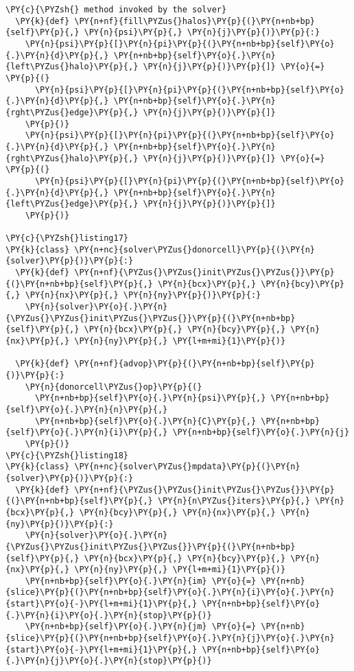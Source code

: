 \begin{Verbatim}[commandchars=\\\{\}]
  \PY{c}{\PYZsh{} method invoked by the solver}
  \PY{k}{def} \PY{n+nf}{fill\PYZus{}halos}\PY{p}{(}\PY{n+nb+bp}{self}\PY{p}{,} \PY{n}{psi}\PY{p}{,} \PY{n}{j}\PY{p}{)}\PY{p}{:}
    \PY{n}{psi}\PY{p}{[}\PY{n}{pi}\PY{p}{(}\PY{n+nb+bp}{self}\PY{o}{.}\PY{n}{d}\PY{p}{,} \PY{n+nb+bp}{self}\PY{o}{.}\PY{n}{left\PYZus{}halo}\PY{p}{,} \PY{n}{j}\PY{p}{)}\PY{p}{]} \PY{o}{=} \PY{p}{(}
      \PY{n}{psi}\PY{p}{[}\PY{n}{pi}\PY{p}{(}\PY{n+nb+bp}{self}\PY{o}{.}\PY{n}{d}\PY{p}{,} \PY{n+nb+bp}{self}\PY{o}{.}\PY{n}{rght\PYZus{}edge}\PY{p}{,} \PY{n}{j}\PY{p}{)}\PY{p}{]}
    \PY{p}{)}
    \PY{n}{psi}\PY{p}{[}\PY{n}{pi}\PY{p}{(}\PY{n+nb+bp}{self}\PY{o}{.}\PY{n}{d}\PY{p}{,} \PY{n+nb+bp}{self}\PY{o}{.}\PY{n}{rght\PYZus{}halo}\PY{p}{,} \PY{n}{j}\PY{p}{)}\PY{p}{]} \PY{o}{=} \PY{p}{(}
      \PY{n}{psi}\PY{p}{[}\PY{n}{pi}\PY{p}{(}\PY{n+nb+bp}{self}\PY{o}{.}\PY{n}{d}\PY{p}{,} \PY{n+nb+bp}{self}\PY{o}{.}\PY{n}{left\PYZus{}edge}\PY{p}{,} \PY{n}{j}\PY{p}{)}\PY{p}{]}
    \PY{p}{)}

\PY{c}{\PYZsh{}listing17}
\PY{k}{class} \PY{n+nc}{solver\PYZus{}donorcell}\PY{p}{(}\PY{n}{solver}\PY{p}{)}\PY{p}{:}
  \PY{k}{def} \PY{n+nf}{\PYZus{}\PYZus{}init\PYZus{}\PYZus{}}\PY{p}{(}\PY{n+nb+bp}{self}\PY{p}{,} \PY{n}{bcx}\PY{p}{,} \PY{n}{bcy}\PY{p}{,} \PY{n}{nx}\PY{p}{,} \PY{n}{ny}\PY{p}{)}\PY{p}{:}
    \PY{n}{solver}\PY{o}{.}\PY{n}{\PYZus{}\PYZus{}init\PYZus{}\PYZus{}}\PY{p}{(}\PY{n+nb+bp}{self}\PY{p}{,} \PY{n}{bcx}\PY{p}{,} \PY{n}{bcy}\PY{p}{,} \PY{n}{nx}\PY{p}{,} \PY{n}{ny}\PY{p}{,} \PY{l+m+mi}{1}\PY{p}{)}

  \PY{k}{def} \PY{n+nf}{advop}\PY{p}{(}\PY{n+nb+bp}{self}\PY{p}{)}\PY{p}{:}
    \PY{n}{donorcell\PYZus{}op}\PY{p}{(}
      \PY{n+nb+bp}{self}\PY{o}{.}\PY{n}{psi}\PY{p}{,} \PY{n+nb+bp}{self}\PY{o}{.}\PY{n}{n}\PY{p}{,} 
      \PY{n+nb+bp}{self}\PY{o}{.}\PY{n}{C}\PY{p}{,} \PY{n+nb+bp}{self}\PY{o}{.}\PY{n}{i}\PY{p}{,} \PY{n+nb+bp}{self}\PY{o}{.}\PY{n}{j}
    \PY{p}{)}
\PY{c}{\PYZsh{}listing18}
\PY{k}{class} \PY{n+nc}{solver\PYZus{}mpdata}\PY{p}{(}\PY{n}{solver}\PY{p}{)}\PY{p}{:}
  \PY{k}{def} \PY{n+nf}{\PYZus{}\PYZus{}init\PYZus{}\PYZus{}}\PY{p}{(}\PY{n+nb+bp}{self}\PY{p}{,} \PY{n}{n\PYZus{}iters}\PY{p}{,} \PY{n}{bcx}\PY{p}{,} \PY{n}{bcy}\PY{p}{,} \PY{n}{nx}\PY{p}{,} \PY{n}{ny}\PY{p}{)}\PY{p}{:}
    \PY{n}{solver}\PY{o}{.}\PY{n}{\PYZus{}\PYZus{}init\PYZus{}\PYZus{}}\PY{p}{(}\PY{n+nb+bp}{self}\PY{p}{,} \PY{n}{bcx}\PY{p}{,} \PY{n}{bcy}\PY{p}{,} \PY{n}{nx}\PY{p}{,} \PY{n}{ny}\PY{p}{,} \PY{l+m+mi}{1}\PY{p}{)}
    \PY{n+nb+bp}{self}\PY{o}{.}\PY{n}{im} \PY{o}{=} \PY{n+nb}{slice}\PY{p}{(}\PY{n+nb+bp}{self}\PY{o}{.}\PY{n}{i}\PY{o}{.}\PY{n}{start}\PY{o}{-}\PY{l+m+mi}{1}\PY{p}{,} \PY{n+nb+bp}{self}\PY{o}{.}\PY{n}{i}\PY{o}{.}\PY{n}{stop}\PY{p}{)}
    \PY{n+nb+bp}{self}\PY{o}{.}\PY{n}{jm} \PY{o}{=} \PY{n+nb}{slice}\PY{p}{(}\PY{n+nb+bp}{self}\PY{o}{.}\PY{n}{j}\PY{o}{.}\PY{n}{start}\PY{o}{-}\PY{l+m+mi}{1}\PY{p}{,} \PY{n+nb+bp}{self}\PY{o}{.}\PY{n}{j}\PY{o}{.}\PY{n}{stop}\PY{p}{)}


\end{Verbatim}
